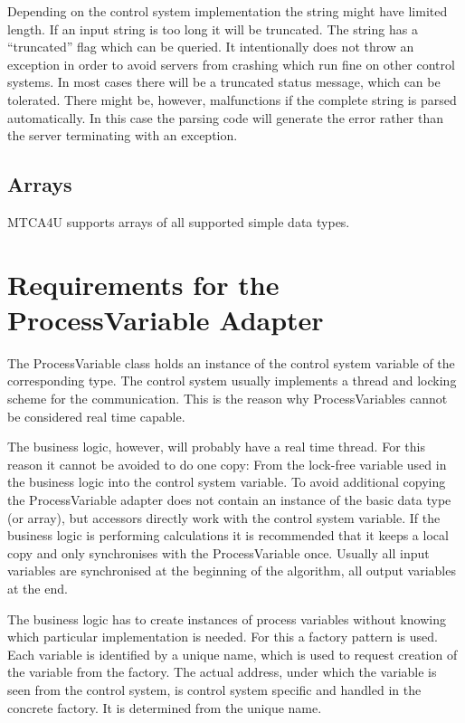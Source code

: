 \documentclass[11pt,a4paper]{scrartcl}
\begin{document}
Depending on the control system implementation the string might have limited
length. If an input string is too long it will be truncated. The string has a
“truncated” flag which can be queried. It intentionally does not throw an
exception in order to avoid servers from crashing which run fine on other
control systems. In most cases there will be a truncated status message, which
can be tolerated. There might be, however, malfunctions if the complete string
is parsed automatically. In this case the parsing code will generate the error
rather than the server terminating with an exception. 

\subsection{Arrays}

MTCA4U supports arrays of all supported simple data types.

\section{Requirements for the ProcessVariable Adapter}\label{section_process_variable_adapter}

The ProcessVariable class holds an instance of the control system variable of
the corresponding type. The control system usually implements a thread and
locking scheme for the communication. This is the reason why ProcessVariables
cannot be considered real time capable. 

The business logic, however, will probably have a real time thread. For this
reason it cannot be avoided to do one copy: From the lock-free variable used
in the business logic into the control system variable. To avoid additional
copying the ProcessVariable adapter does not contain an instance of the basic
data type (or array), but accessors directly work with the control system
variable. 
If the business logic is performing calculations it is recommended that 
it keeps a local copy and only synchronises with the ProcessVariable once.
Usually all input variables are synchronised at the beginning of the 
algorithm, all output variables at the end.

The business logic has to create instances of process variables without
knowing which particular implementation is needed. For this a factory pattern
is used. Each variable is identified by a unique name, which is used to
request creation of the variable from the factory. The actual address, under
which the variable is seen from the control system, is control system specific
and handled in the concrete factory. It is determined from the unique name. 
\end{document}
